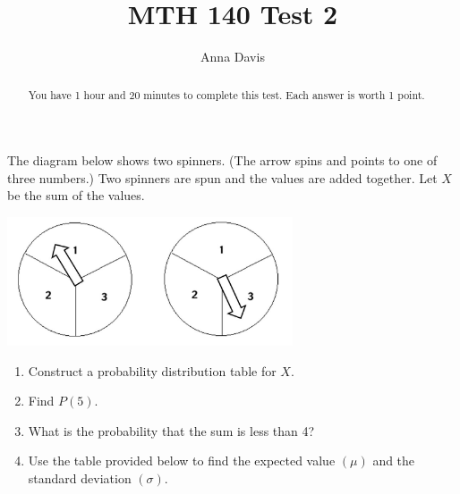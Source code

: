 \documentclass{ximera}
\author{Anna Davis} \title{MTH 140 Test 2}
\begin{document}
\begin{abstract}
 You have 1 hour and 20 minutes to complete this test.  Each answer is worth 1 point.
\end{abstract}
\maketitle

\begin{problem}\label{prob:test2prob1}
The diagram below shows two spinners.  (The arrow spins and points to one of three numbers.)  Two spinners are spun and the values are added together.  Let $X$ be the sum of the values.  

\begin{image}
   
\includegraphics[height=1.5in]{test2pic1.jpg}~
 
\end{image}


\begin{enumerate}
    \item Construct a probability distribution table for $X$.
\item Find $P(5)$.

\item What is the probability that the sum is less than 4?

\item Use the table provided below to find the expected value $(\mu)$ and the standard deviation $(\sigma)$.


\end{enumerate}
\end{problem}
\end{document}
